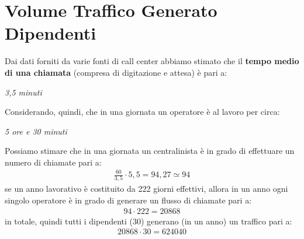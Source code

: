 \section[Volume Traffico Generato Dipendenti]{Volume Traffico Generato Dipendenti}
Dai dati forniti da varie fonti di call center abbiamo stimato che il \textbf{tempo medio di una chiamata} (compresa di digitazione e attesa) è pari a:
\begin{center}
	\textit{ 3,5 minuti }
\end{center}
Considerando, quindi, che in una giornata un operatore è al lavoro per circa:
\begin{center}
	\textit{ 5 ore e 30 minuti }
\end{center}
Possiamo stimare che in una giornata un centralinista è in grado di effettuare un numero di chiamate pari a:
	\begin{equation}
	\label{eq:num_chiamate_singolo_operatore_giorno}
	\begin{split}
		\frac{60}{3,5} \cdot 5,5 = 94,27 \simeq 94 
	\end{split}
	\end{equation}
se un anno lavorativo è costituito da 222 giorni effettivi, allora in un anno ogni singolo operatore è in grado di generare un flusso di chiamate pari a:
	\begin{equation}
	\label{eq:num_chiamate_singolo_operatore_anno}
	\begin{split}
		94 \cdot 222 = 20868 
	\end{split}
	\end{equation}
in totale, quindi tutti i dipendenti (30) generano (in un anno) un traffico pari a:
	\begin{equation}
	\label{eq:num_chiamate_azienda_anno}
	\begin{split}
		20868 \cdot 30 = 624040 
	\end{split}
	\end{equation}
